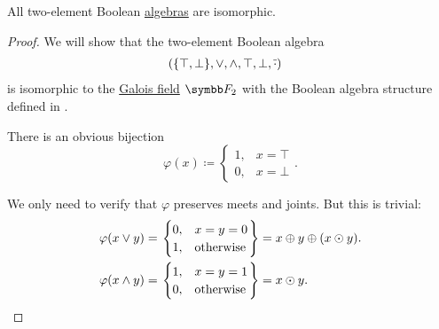 \begin{Proposition}\label{thm:binary_boolean_algebras_are_isomorphic}
  All two-element Boolean \hyperref[def:boolean_algebra]{algebras} are isomorphic.
\end{Proposition}
\begin{proof}
  We will show that the two-element Boolean algebra
  \begin{align*}
    &\left( \{ \top, \bot \}, \vee, \wedge, \top, \bot, \overline{\cdot} \right)
  \end{align*}
  is isomorphic to the \hyperref[thm:galois_field_existence]{Galois field} \( \BF_2 \) with the Boolean algebra structure defined in .

  There is an obvious bijection
  \begin{equation*}
    \varphi(x) \coloneqq \begin{cases}
      1, &x = \top \\
      0, &x = \bot
    \end{cases}.
  \end{equation*}

  We only need to verify that \( \varphi \) preserves meets and joints. But this is trivial:
  \begin{align*}
    \varphi(x \vee y)
    &=
    \begin{rcases}
      \begin{cases}
        0, &x = y = 0 \\
        1, &\text{otherwise}
      \end{cases}
    \end{rcases}
    =
    x \oplus y \oplus (x \odot y).
    \\
    \varphi(x \wedge y)
    &=
    \begin{rcases}
      \begin{cases}
        1, &x = y = 1 \\
        0, &\text{otherwise}
      \end{cases}
    \end{rcases}
    =
    x \odot y.
  \end{align*}
\end{proof}
